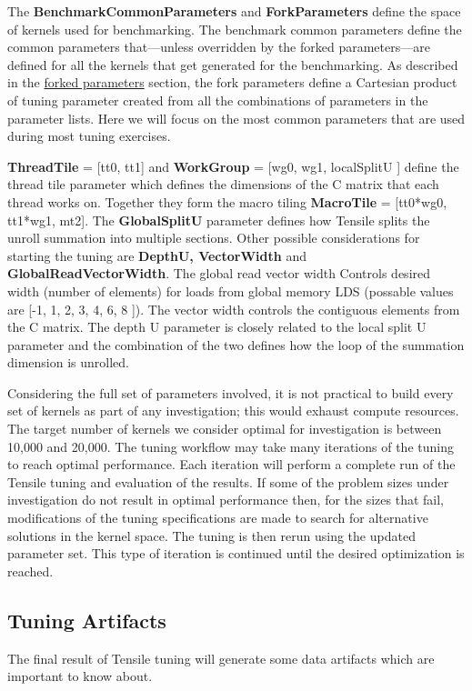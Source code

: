 \documentclass[]{article}
\begin{document}
The  {\color{ForestGreen} \bf BenchmarkCommonParameters} and  {\color{ForestGreen} \bf ForkParameters} define the space of kernels used for benchmarking. The benchmark common parameters define the common parameters that---unless overridden by the forked parameters---are defined for all the kernels that get generated for the benchmarking. As described in the \hyperref[sec:forkParams]{forked parameters} section, the fork parameters define a Cartesian product of tuning parameter created from all the combinations of parameters in the parameter lists. Here we will focus on the most common parameters that are used during most tuning exercises.

{\color{ForestGreen} \bf ThreadTile} = [tt0, tt1] and {\color{ForestGreen} \bf  WorkGroup} = [wg0, wg1, localSplitU ] define the thread tile parameter which defines the dimensions of the C matrix that each thread works on. Together they form the macro tiling {\color{ForestGreen} \bf MacroTile} = [tt0*wg0, tt1*wg1, mt2]. The {\color{ForestGreen} \bf GlobalSplitU} parameter defines how Tensile splits the unroll summation into multiple sections. Other possible considerations for starting the tuning are {\color{ForestGreen} \bf DepthU, VectorWidth} and {\color{ForestGreen} \bf GlobalReadVectorWidth}. The global read vector width Controls desired width (number of elements) for loads from global memory LDS (possable values are [-1, 1, 2, 3, 4, 6, 8 ]). The vector width controls the contiguous elements from the C matrix. The depth U parameter is closely related to the local split U parameter and the combination of the two defines how the loop of the summation dimension is unrolled.

Considering the full set of parameters involved, it is not practical to build every set of kernels as part of any investigation; this would exhaust compute resources. The target number of kernels we consider optimal for investigation is between 10,000 and 20,000. The tuning workflow may take many iterations of the tuning to reach optimal performance. Each iteration will perform a complete run of the Tensile tuning and evaluation of the results. If some of the problem sizes under investigation do not result in optimal performance then, for the sizes that fail, modifications of the tuning specifications are made to search for alternative solutions in the kernel space. The tuning is then rerun using the updated parameter set. This type of iteration is continued until the desired optimization is reached.

\subsection{Tuning Artifacts}
The final result of Tensile tuning will generate some data artifacts which are important to know about.
\end{document}
